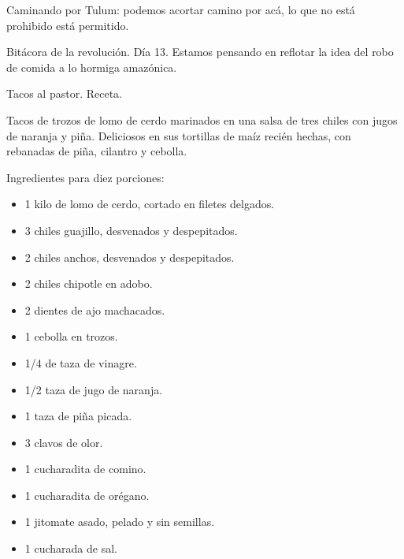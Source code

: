 \documentclass[12pt,twoside,openright,a5paper]{book}
\begin{document}
\vspace{0.5cm}
\hrulefill\hspace{0.2cm} \decofourleft\decofourright \hspace{0.2cm} \hrulefill
\vspace{0.5cm}

Caminando por Tulum: podemos acortar camino por acá, lo que no está
prohibido está permitido.


\vspace{0.5cm}
\hrulefill\hspace{0.2cm} \decofourleft\decofourright \hspace{0.2cm} \hrulefill
\vspace{0.5cm}

Bitácora de la revolución. Día 13. Estamos pensando en reflotar la idea
del robo de comida a lo hormiga amazónica.


\vspace{0.5cm}
\hrulefill\hspace{0.2cm} \decofourleft\decofourright \hspace{0.2cm} \hrulefill
\vspace{0.5cm}

Tacos al pastor. Receta.

Tacos de trozos de lomo de cerdo marinados en una salsa de tres chiles
con jugos de naranja y piña. Deliciosos en sus tortillas de maíz recién
hechas, con rebanadas de piña, cilantro y cebolla.

Ingredientes para diez porciones:

\begin{itemize} \item 1 kilo de lomo de cerdo, cortado en filetes delgados.
\item 3 chiles guajillo, desvenados y despepitados.  \item 2 chiles anchos,
desvenados y despepitados.  \item 2 chiles chipotle en adobo.  \item 2
dientes de ajo machacados.  \item 1 cebolla en trozos.  \item 1/4 de taza
de vinagre.  \item 1/2 taza de jugo de naranja.  \item 1 taza de piña
picada.  \item 3 clavos de olor.  \item 1 cucharadita de comino.  \item 1
cucharadita de orégano.  \item 1 jitomate asado, pelado y sin semillas.
\item 1 cucharada de sal.  \end {itemize}
\end{document}

